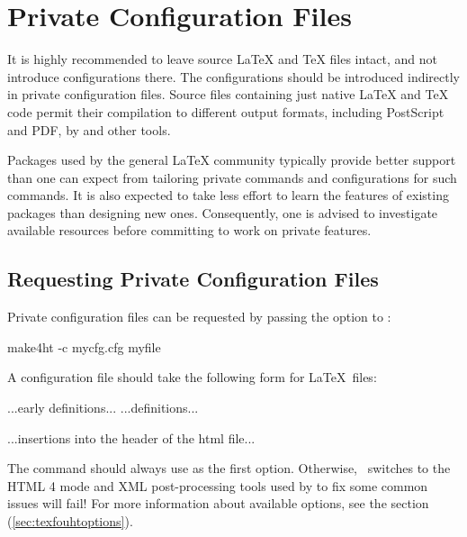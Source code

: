 \section{Private Configuration Files}\label{sec:private-configuration}

It is highly recommended to leave source LaTeX and TeX files intact, and not
introduce \texfourht{} configurations there. The configurations should be introduced
indirectly in private configuration files. Source files containing just native
LaTeX and TeX code permit their compilation to different output formats,
including PostScript and PDF, by \texfourht{} and other tools.

Packages used by the general LaTeX community typically provide better support
than one can expect from tailoring private commands and configurations for such
commands. It is also expected to take less effort to learn the features of
existing packages than designing new ones. Consequently, one is advised to
investigate available resources before committing to work on private features. 

\subsection{Requesting Private Configuration Files}

Private configuration files can be requested by passing the 
option to \makefourht:

\begin{shellcommand}
make4ht -c mycfg.cfg myfile 
\end{shellcommand}


A configuration file should take the following form for \LaTeX\ files:

\begin{texsource}
...early definitions...
...definitions...

...insertions into the header of the html file...
\EndPreamble
\end{texsource}

The  command should always use  
as the first option. Otherwise, \texfourht\ switches to the HTML 4 mode and XML
post-processing tools used by \makefourht{} to fix some common issues will fail! For 
more information about available options, see the  
section (\ref{sec:texfouhtoptions}).

\begin{texsource}
 
\EndPreamble 
\end{texsource}

